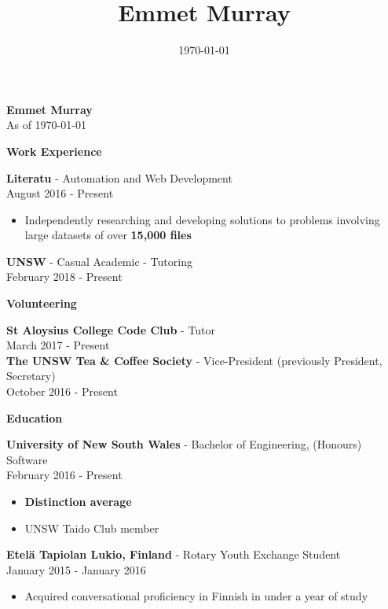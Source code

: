\documentclass{article}
\title{\textbf{Emmet Murray}}
\date{\today}
\newcommand{\minititle}[1]{{\Large \begin{center} \textbf{#1} \end{center}} \vspace{0.2cm}}
\newcommand{\resumeEntry}[3]{{\large \textbf{#1} - #2} \\ {\small #3} }
\begin{document}
 
%
\begin{minipage}[t]{0.6\linewidth}   
    \begin{center}
        { \huge \textbf{Emmet Murray}} \\
        \vspace{0.4cm}
        As of \today
    \end{center}
    {
        \minititle{Work Experience}
        \resumeEntry{Literatu}{Automation and Web Development}{August 2016 - Present}
        \begin{itemize}
            \setlength\itemsep{0.01cm}
            \item Independently researching and developing solutions to problems involving large datasets of over \textbf{15,000 files}
        \end{itemize}
        \vspace{0.3cm}
        \resumeEntry{UNSW}{Casual Academic - Tutoring}{February 2018 - Present}
    }
    {
        \vspace{0.05cm}
        \minititle{Volunteering}
        \resumeEntry{St Aloysius College Code Club}{Tutor}{March 2017 - Present} \\
        \noindent
        \resumeEntry{The UNSW Tea \& Coffee Society}{Vice-President (previously President, Secretary)}{October 2016 - Present}
    }
    {
        \vspace{0.1cm}
        \minititle{Education}
        \resumeEntry{University of New South Wales}{Bachelor of Engineering, (Honours) Software}{February 2016 - Present}
        \begin{itemize}
            \setlength\itemsep{0.01cm}
            \item \textbf{Distinction average}
            \item UNSW Taido Club member
        \end{itemize}
        \vspace{0.4cm}
        \resumeEntry{Etel{\"a} Tapiolan Lukio, Finland}{Rotary Youth Exchange Student}{January 2015 - January 2016}
        \begin{itemize}
            \setlength\itemsep{0.01cm}
            \item Acquired conversational proficiency in Finnish in under a year of study
        \end{itemize}
    }
\end{minipage}\hspace{1cm}
\end{document}
